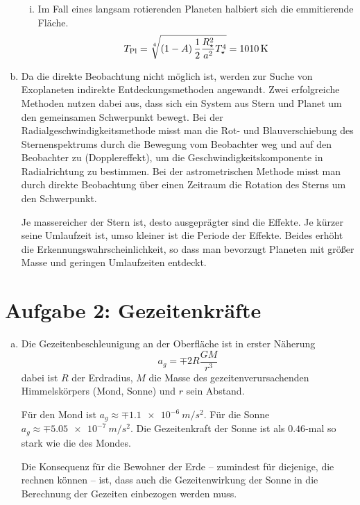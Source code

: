 \documentclass[a4paper,german,12pt,smallheadings]{scrartcl}
\begin{document}
\begin{enumerate}[a)]
\begin{enumerate}[(i)]
      \item
        Im Fall eines langsam rotierenden Planeten halbiert sich die
        emmitierende Fläche.
        \begin{equation}
          T_\text{Pl} = \sqrt[4]{
            \del{1-A} \frac{1}{2} \frac{R_\star^2}{a^2} T_\star^4
          } = \SI{1010}{\kelvin}
        \end{equation}

    \end{enumerate}
  \item
    Da die direkte Beobachtung nicht möglich ist, werden zur Suche von
    Exoplaneten indirekte Entdeckungsmethoden angewandt. Zwei erfolgreiche
    Methoden nutzen dabei aus, dass sich ein System aus Stern und Planet um den
    gemeinsamen Schwerpunkt bewegt. Bei der Radialgeschwindigkeitsmethode misst
    man die Rot- und Blauverschiebung des Sternenspektrums durch die Bewegung
    vom Beobachter weg und auf den Beobachter zu (Dopplereffekt), um die
    Geschwindigkeitskomponente in Radialrichtung zu bestimmen. Bei der
    astrometrischen Methode misst man durch direkte Beobachtung über einen
    Zeitraum die Rotation des Sterns um den Schwerpunkt.

    Je massereicher der Stern ist, desto ausgeprägter sind die Effekte. Je
    kürzer seine Umlaufzeit ist, umso kleiner ist die Periode der Effekte.
    Beides erhöht die Erkennungswahrscheinlichkeit, so dass man bevorzugt
    Planeten mit größer Masse und geringen Umlaufzeiten entdeckt.
\end{enumerate}

\section*{Aufgabe 2: Gezeitenkräfte}
\begin{enumerate}[a)]
  \item
    Die Gezeitenbeschleunigung an der Oberfläche ist in erster Näherung
    \begin{equation}
      a_g = \mp 2 R \frac{GM}{r^3}
    \end{equation}
    dabei ist $R$ der Erdradius, $M$ die Masse des gezeitenverursachenden
    Himmelskörpers (Mond, Sonne) und $r$ sein Abstand.

    Für den Mond ist $a_g \approx \mp \SI{1.1e-6}{m/s^2}$. Für die Sonne $a_g
    \approx \mp \SI{5.05e-7}{m/s^2}$. Die Gezeitenkraft der Sonne ist als
    $\num{0.46}$-mal so stark wie die des Mondes.

    Die Konsequenz für die Bewohner der Erde -- zumindest für diejenige, die
    rechnen können -- ist, dass auch die Gezeitenwirkung der Sonne in die
    Berechnung der Gezeiten einbezogen werden muss.

\end{enumerate}
\end{document}
